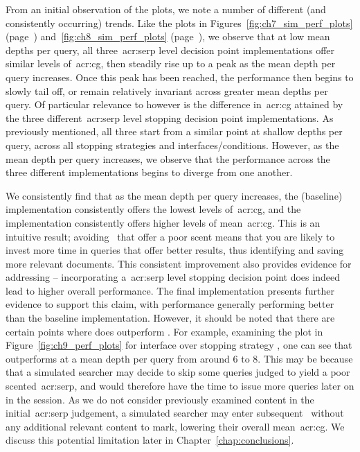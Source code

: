 From an initial observation of the plots, we note a number of different (and consistently occurring) trends. Like the plots in Figures~\ref{fig:ch7_sim_perf_plots} (page~\pageref{fig:ch7_sim_perf_plots}) and~\ref{fig:ch8_sim_perf_plots} (page~\pageref{fig:ch8_sim_perf_plots}), we observe that at low mean depths per query, all three~\gls{acr:serp} level decision point implementations offer similar levels of~\gls{acr:cg}, then steadily rise up to a peak as the mean depth per query increases. Once this peak has been reached, the performance then begins to slowly tail off, or remain relatively invariant across greater mean depths per query. Of particular relevance to  however is the difference in~\gls{acr:cg} attained by the three different~\gls{acr:serp} level stopping decision point implementations. As previously mentioned, all three start from a similar point at shallow depths per query, across all stopping strategies and interfaces/conditions. However, as the mean depth per query increases, we observe that the performance across the three different implementations begins to diverge from one another.

We consistently find that as the mean depth per query increases, the  (baseline) implementation consistently offers the lowest levels of~\gls{acr:cg}, and the  implementation consistently offers higher levels of mean~\gls{acr:cg}. This is an intuitive result; avoiding~ that offer a poor scent means that you are likely to invest more time in queries that offer better results, thus identifying and saving more relevant documents. This consistent improvement also provides evidence for addressing  -- incorporating a~\gls{acr:serp} level stopping decision point does indeed lead to higher overall performance. The final implementation  presents further evidence to support this claim, with performance generally performing better than the baseline  implementation. However, it should be noted that there are certain points where  does outperform . For example, examining the plot in Figure~\ref{fig:ch9_perf_plots} for interface  over stopping strategy , one can see that  outperforms  at a mean depth per query from around $6$ to $8$. This may be because that a simulated searcher may decide to skip some queries judged to yield a poor scented~\gls{acr:serp}, and would therefore have the time to issue more queries later on in the session. As we do not consider previously examined content in the initial~\gls{acr:serp} judgement, a simulated searcher may enter subsequent~ without any additional relevant content to mark, lowering their overall mean~\gls{acr:cg}. We discuss this potential limitation later in Chapter~\ref{chap:conclusions}.

